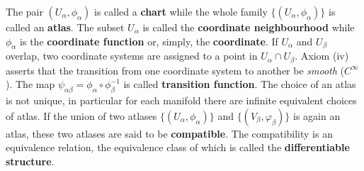 \documentclass[../main/main.tex]{subfiles}
\begin{document}
\begin{definition}{}
\begin{enumerate}
\begin{figure}[H]
\end{figure}
\end{enumerate}
The pair $(U_\alpha, \phi_\alpha)$ is called a \textbf{chart} while the whole family $\{(U_\alpha, \phi_\alpha)\}$ is called an \textbf{atlas}. The subset $U_\alpha$ is called the \textbf{coordinate neighbourhood} while $\phi_\alpha$ is the \textbf{coordinate function} or, simply, the \textbf{coordinate}. If $U_\alpha$ and $U_\beta$ overlap, two coordinate systems are assigned to a point in $U_\alpha\cap U_\beta$. Axiom (iv) asserts that the transition from one coordinate system to another be \emph{smooth} ($C^\infty$). The map $\psi_{\alpha\beta}=\phi_\alpha\circ\phi_\beta^{-1}$ is called \textbf{transition function}. The choice of an atlas is not unique, in particular for each manifold there are infinite equivalent choices of atlas. If the union of two atlases $\{(U_\alpha, \phi_\alpha)\}$ and $\{(V_\beta, \varphi_\beta)\}$ is again an atlas, these two atlases are said to be \textbf{compatible}. The compatibility is an equivalence relation, the equivalence class of which is called the \textbf{differentiable structure}.
\end{definition}
\end{document}

